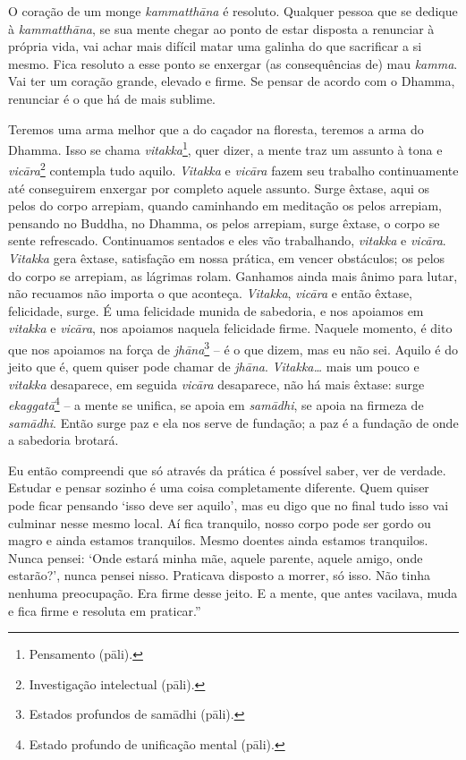 O coração de um monge \emph{kammatthāna} é resoluto. Qualquer pessoa que
se dedique à \emph{kammatthāna}, se sua mente chegar ao ponto de estar
disposta a renunciar à própria vida, vai achar mais difícil matar uma
galinha do que sacrificar a si mesmo. Fica resoluto a esse ponto se
enxergar (as consequências de) mau \emph{kamma}. Vai ter um coração
grande, elevado e firme. Se pensar de acordo com o Dhamma, renunciar é o
que há de mais sublime.

Teremos uma arma melhor que a do caçador na floresta, teremos a arma do
Dhamma. Isso se chama \emph{vitakka}\footnote{Pensamento (pāli).}, quer
dizer, a mente traz um assunto à tona e \emph{vicāra}\footnote{Investigação
  intelectual (pāli).} contempla tudo aquilo. \emph{Vitakka} e
\emph{vicāra} fazem seu trabalho continuamente até conseguirem enxergar
por completo aquele assunto. Surge êxtase, aqui os pelos do corpo
arrepiam, quando caminhando em meditação os pelos arrepiam, pensando no
Buddha, no Dhamma, os pelos arrepiam, surge êxtase, o corpo se sente
refrescado. Continuamos sentados e eles vão trabalhando, \emph{vitakka}
e \emph{vicāra}. \emph{Vitakka} gera êxtase, satisfação em nossa
prática, em vencer obstáculos; os pelos do corpo se arrepiam, as
lágrimas rolam. Ganhamos ainda mais ânimo para lutar, não recuamos não
importa o que aconteça. \emph{Vitakka}, \emph{vicāra} e então êxtase,
felicidade, surge. É uma felicidade munida de sabedoria, e nos apoiamos
em \emph{vitakka} e \emph{vicāra}, nos apoiamos naquela felicidade
firme. Naquele momento, é dito que nos apoiamos na força de
\emph{jhāna}\footnote{Estados profundos de samādhi (pāli).} -- é o que
dizem, mas eu não sei. Aquilo é do jeito que é, quem quiser pode chamar
de \emph{jhāna}. \emph{Vitakka\ldots{}} mais um pouco e \emph{vitakka}
desaparece, em seguida \emph{vicāra} desaparece, não há mais êxtase:
surge \emph{ekaggatā}\footnote{Estado profundo de unificação mental
  (pāli).} -- a mente se unifica, se apoia em \emph{samādhi}, se apoia
na firmeza de \emph{samādhi}. Então surge paz e ela nos serve de
fundação; a paz é a fundação de onde a sabedoria brotará.

Eu então compreendi que só através da prática é possível saber, ver de
verdade. Estudar e pensar sozinho é uma coisa completamente diferente.
Quem quiser pode ficar pensando `isso deve ser aquilo', mas eu digo que
no final tudo isso vai culminar nesse mesmo local. Aí fica tranquilo,
nosso corpo pode ser gordo ou magro e ainda estamos tranquilos. Mesmo
doentes ainda estamos tranquilos. Nunca pensei: `Onde estará minha mãe,
aquele parente, aquele amigo, onde estarão?', nunca pensei nisso.
Praticava disposto a morrer, só isso. Não tinha nenhuma preocupação. Era
firme desse jeito. E a mente, que antes vacilava, muda e fica firme e
resoluta em praticar.''

